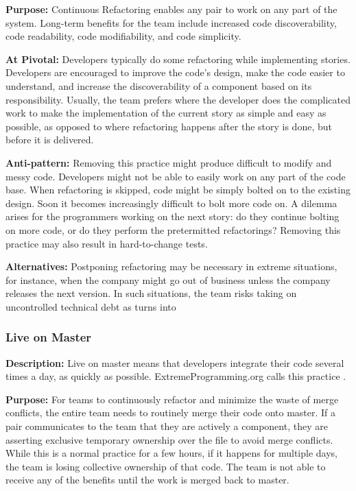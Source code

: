\textbf{Purpose:} Continuous Refactoring enables any pair to work on any part of the system. Long-term benefits for the team include increased code discoverability, code readability, code modifiability, and code simplicity. 

\textbf{At Pivotal:} Developers typically do some refactoring while implementing stories. Developers are encouraged to improve the code’s design, make the code easier to understand, and increase the discoverability of a component based on its responsibility. Usually, the team prefers  where the developer does the complicated work to make the implementation of the current story as simple and easy as possible, as opposed to  where refactoring happens after the story is done, but before it is delivered. 

\textbf{Anti-pattern:} Removing this practice might produce difficult to modify and messy code. Developers might not be able to easily work on any part of the code base. When refactoring is skipped, code might be simply bolted on to the existing design. Soon it becomes increasingly difficult to bolt more code on. A dilemma arises for the programmers working on the next story: do they continue bolting on more code, or do they perform the pretermitted refactorings? Removing this practice may also result in hard-to-change tests.

\textbf{Alternatives:} Postponing refactoring may be necessary in extreme situations, for instance, when the company might go out of business unless the company releases the next version. In such situations, the team risks taking on uncontrolled technical debt as  turns into  

\subsubsection{Live on Master}
\textbf{Description:} Live on master means that developers integrate their code several times a day, as quickly as possible. ExtremeProgramming.org calls this practice  \cite{WellsIntegrateOften}.

\textbf{Purpose:} For teams to continuously refactor and minimize the waste of merge conflicts, the entire team needs to routinely merge their code onto master. If a pair communicates to the team that they are actively  a component, they are asserting exclusive temporary ownership over the file to avoid merge conflicts. While this is a normal practice for a few hours, if it happens for multiple days, the team is losing collective ownership of that code. The team is not able to receive any of the benefits until the work is merged back to master. 


